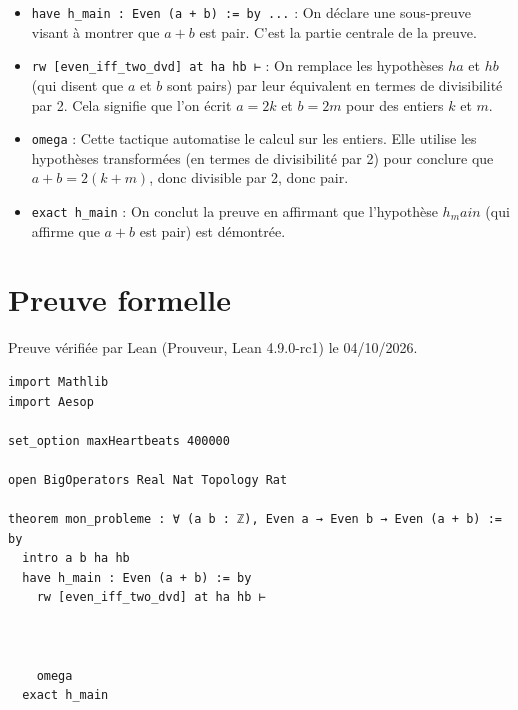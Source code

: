\documentclass[11pt]{article}
\theoremstyle{plain}
\begin{document}
\begin{itemize}
\item \texttt{have h\_main : Even (a + b) := by ...} : On déclare une sous-preuve visant à montrer que $a + b$ est pair. C’est la partie centrale de la preuve.
\end{itemize}

\begin{itemize}
\item \texttt{rw [even\_iff\_two\_dvd] at ha hb ⊢} : On remplace les hypothèses $ha$ et $hb$ (qui disent que $a$ et $b$ sont pairs) par leur équivalent en termes de divisibilité par 2. Cela signifie que l’on écrit $a = 2k$ et $b = 2m$ pour des entiers $k$ et $m$.
\end{itemize}

\begin{itemize}
\item \texttt{omega} : Cette tactique automatise le calcul sur les entiers. Elle utilise les hypothèses transformées (en termes de divisibilité par 2) pour conclure que $a + b = 2(k + m)$, donc divisible par 2, donc pair.
\end{itemize}

\begin{itemize}
\item \texttt{exact h\_main} : On conclut la preuve en affirmant que l’hypothèse $h_main$ (qui affirme que $a + b$ est pair) est démontrée.
\end{itemize}

\section*{Preuve formelle}
Preuve vérifiée par Lean (Prouveur, Lean 4.9.0-rc1) le 04/10/2026.
\begin{Verbatim}[breaklines=true,frame=single,fontsize=\small,rulecolor=\color{black!25}]
import Mathlib
import Aesop

set_option maxHeartbeats 400000

open BigOperators Real Nat Topology Rat

theorem mon_probleme : ∀ (a b : ℤ), Even a → Even b → Even (a + b) := by
  intro a b ha hb
  have h_main : Even (a + b) := by
    rw [even_iff_two_dvd] at ha hb ⊢
    
    
    
    omega
  exact h_main
\end{Verbatim}
\end{document}

